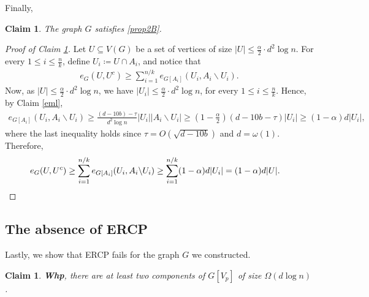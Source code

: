 \documentclass[notitlepage]{scrartcl}
\newtheorem{claim}[thm]{Claim}
\begin{document}
Finally,

\begin{claim} \label{third}
    The graph $G$ satisfies \ref{prop2B}.
\end{claim}

\begin{proof}[Proof of Claim \ref{third}]
    Let $U\subseteq V(G)$ be a set of vertices of size $|U|\le \frac{\alpha}{2}\cdot d^2\log n$. For every $1\le i\le \frac{n}{k}$, define $U_i\coloneqq U\cap A_i$, and notice that 
    \begin{align*}
        e_G(U,U^c)\ge \sum_{i=1}^{n/k} e_{G[A_i]}(U_i,A_i\backslash U_i).
    \end{align*}
    Now, as $|U|\le \frac{\alpha}{2}\cdot d^2\log n$, we have $|U_i|\le \frac{\alpha}{2}\cdot d^2\log n$, for every $1\le i\le \frac{n}{k}$. Hence, by Claim \ref{eml}, 
    \begin{align*}
        e_{G[A_i]}(U_i,A_i\backslash U_i)\ge \frac{(d-10b)-\tau}{d^2\log n}|U_i||A_i\backslash U_i|\ge \left(1-\frac{\alpha}{2}\right)(d-10b-\tau)|U_i|\ge (1-\alpha)d|U_i|,
    \end{align*}
    where the last inequality holds since $\tau=O\left(\sqrt{d-10b}\right)$ and $d=\omega(1)$.
    Therefore,
    \begin{align*}
        e_G(U,U^c)\ge \sum_{i=1}^{n/k} e_{G[A_i]}(U_i,A_i\backslash U_i) \ge \sum_{i=1}^{n/k}(1-\alpha)d|U_i|=(1-\alpha)d|U|.&\qedhere
    \end{align*}
\end{proof}

\subsection{The absence of ERCP}\label{noERCP}

Lastly, we show that ERCP fails for the graph $G$ we constructed.

\begin{claim}\label{PnoERCP}
    \textbf{Whp}, there are at least two components of $G[V_p]$ of size $\Omega(d\log n)$.
\end{claim}
\end{document}
